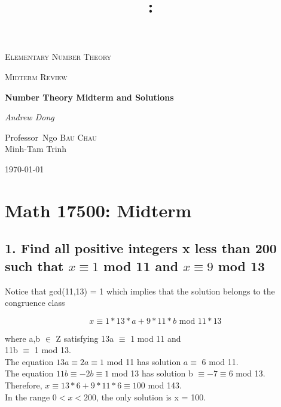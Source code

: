 \documentclass{article}
\title{\vspace{2in}\textmd{\textbf{\hmwkClass:\ \hmwkTitle}}\\\normalsize\vspace{0.1in}\vspace{0.1in}\large{\textit{\hmwkClassInstructor}}\vspace{3in}}
\date{}
\author{\textbf{\hmwkAuthorName}}
\begin{document}
\begin{spacing}{1.1}
\newpage

\begin{titlepage}
	\centering
	{\scshape\LARGE Elementary Number Theory \par}
	\vspace{1cm}
	{\scshape\Large Midterm Review\par}
	\vspace{1.5cm}
	{\huge\bfseries Number Theory Midterm and Solutions\par}
	\vspace{1cm}
	{\Large\itshape Andrew Dong\par}
	\vspace{2cm}

	\vfill


	Professor~Ngo \textsc{Bau Chau}
	\\ Minh-Tam Trinh
	\vspace{5 mm}
	\\{\large \today\par}
\end{titlepage}


\clearpage

\section{Math 17500: Midterm}

\subsection{1.  Find all positive integers x less than 200 such that $x \equiv 1$ mod 11 and $x \equiv 9$ mod 13}

Notice that gcd(11,13) = 1 which implies that the solution belongs to the congruence class

$$ x \equiv 1 * 13 * a + 9 * 11 * b \text{ mod 11} * 13$$

where a,b $\in$ Z satisfying 13a $\equiv$ 1 mod 11 and 
\\11b $\equiv$ 1 mod 13.  
\\The equation $13a \equiv 2a \equiv 1$ mod 11 has solution $a \equiv$ 6 mod 11.  
\\The equation $11b \equiv -2b \equiv 1$ mod 13 has solution b $\equiv -7 \equiv 6$ mod 13.  
\\Therefore, $x \equiv 13 * 6 + 9 * 11 * 6 \equiv 100$ mod 143.  
\\In the range $0 < x < 200$, the only solution is x = 100.  




\end{spacing}
\end{document}
